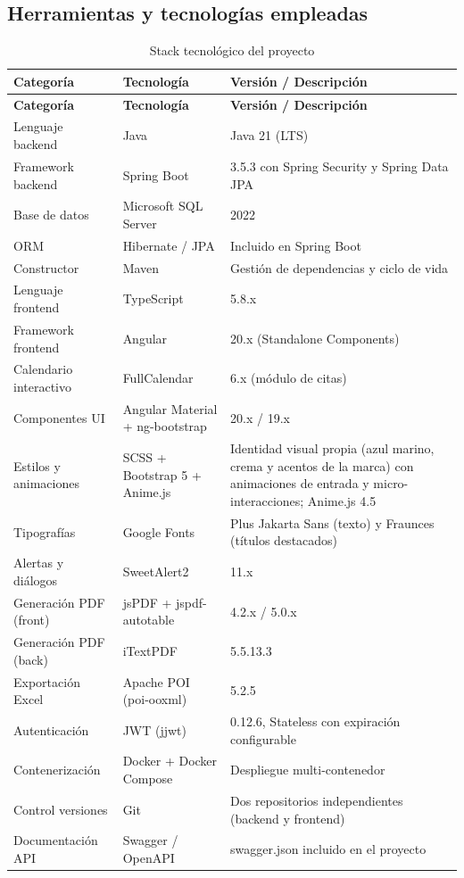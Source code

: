 \documentclass[11pt,a4paper]{report}
\begin{document}
\subsection{Herramientas y tecnologías empleadas}
\begin{longtable}{@{}p{3.4cm} p{4.2cm} p{7.4cm}@{}}
\caption{Stack tecnológico del proyecto}\label{tab:stack}\\
\toprule
\textbf{Categoría} & \textbf{Tecnología} & \textbf{Versión / Descripción} \\
\midrule
\endfirsthead
\toprule
\textbf{Categoría} & \textbf{Tecnología} & \textbf{Versión / Descripción} \\
\midrule
\endhead
\bottomrule
\endfoot
Lenguaje backend & Java & Java 21 (LTS) \\
Framework backend & Spring Boot & 3.5.3 con Spring Security y Spring Data JPA \\
Base de datos & Microsoft SQL Server & 2022 \\
ORM & Hibernate / JPA & Incluido en Spring Boot \\
Constructor & Maven & Gestión de dependencias y ciclo de vida \\
Lenguaje frontend & TypeScript & 5.8.x \\
Framework frontend & Angular & 20.x (Standalone Components) \\
Calendario interactivo & FullCalendar & 6.x (módulo de citas) \\
Componentes UI & Angular Material + ng-bootstrap & 20.x / 19.x \\
Estilos y animaciones & SCSS + Bootstrap 5 + Anime.js & Identidad visual propia (azul marino, crema y acentos de la marca) con animaciones de entrada y micro-interacciones; Anime.js 4.5 \\
Tipografías & Google Fonts & Plus Jakarta Sans (texto) y Fraunces (títulos destacados) \\
Alertas y diálogos & SweetAlert2 & 11.x \\
Generación PDF (front) & jsPDF + jspdf-autotable & 4.2.x / 5.0.x \\
Generación PDF (back) & iTextPDF & 5.5.13.3 \\
Exportación Excel & Apache POI (poi-ooxml) & 5.2.5 \\
Autenticación & JWT (jjwt) & 0.12.6, Stateless con expiración configurable \\
Contenerización & Docker + Docker Compose & Despliegue multi-contenedor \\
Control versiones & Git & Dos repositorios independientes (backend y frontend) \\
Documentación API & Swagger / OpenAPI & swagger.json incluido en el proyecto \\
\end{longtable}
\end{document}
